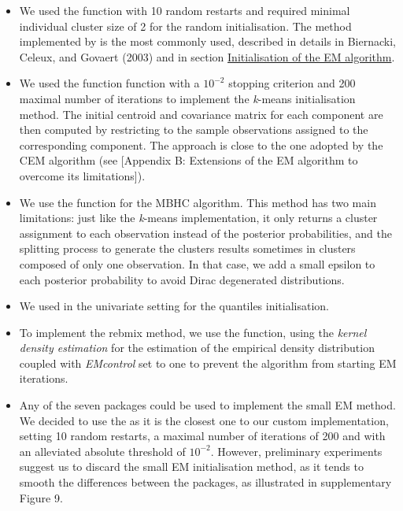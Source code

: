 \begin{itemize}
\item
  We used the function  with 10 random restarts and required minimal individual cluster size of 2 for the random initialisation. The method implemented by  is the most commonly used, described in details in Biernacki, Celeux, and Govaert (2003) and in section \protect\hyperlink{initialisation-of-the-em-algorithm}{Initialisation of the EM algorithm}.
\item
  We used the function  function with a \(10^{-2}\) stopping criterion and 200 maximal number of iterations to implement the \emph{k}-means initialisation method.
  The initial centroid and covariance matrix for each component are then computed by restricting to the sample observations assigned to the corresponding component. The approach is close to the one adopted by the CEM algorithm (see {[}Appendix B: Extensions of the EM algorithm to overcome its limitations{]}).
\item
  We use the  function for the MBHC algorithm. This method has two main limitations: just like the \emph{k}-means implementation, it only returns a cluster assignment to each observation instead of the posterior probabilities, and the splitting process to generate the clusters results sometimes in clusters composed of only one observation. In that case, we add a small epsilon to each posterior probability to avoid Dirac degenerated distributions.
\item
  We used in the univariate setting  for the quantiles initialisation.
\item
  To implement the rebmix method, we use the  function, using the \emph{kernel density estimation} for the estimation of the empirical density distribution coupled with \emph{EMcontrol} set to one to prevent the algorithm from starting EM iterations.
\item
  Any of the seven packages could be used to implement the small EM method. We decided to use the  as it is the closest one to our custom implementation, setting 10 random restarts, a maximal number of iterations of 200 and with an alleviated absolute threshold of \(10^{-2}\). However, preliminary experiments suggest us to discard the small EM
  initialisation method, as it tends to smooth the differences between the packages, as illustrated in supplementary Figure 9.
\end{itemize}

